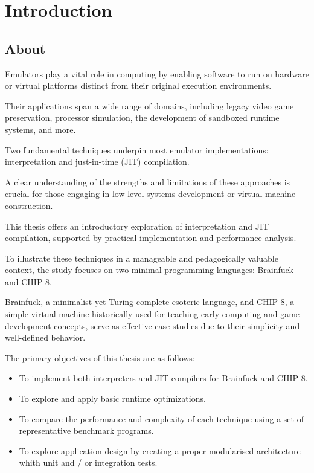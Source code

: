 \chapter{Introduction}
\label{chap:ch1}

\section{About}
\label{chap:ch1sec1}

\par Emulators play a vital role in computing by enabling software to run on hardware or virtual platforms distinct from their original execution environments.

\par Their applications span a wide range of domains, including legacy video game preservation, processor simulation, the development of sandboxed runtime systems, and more.

\par Two fundamental techniques underpin most emulator implementations: interpretation and just-in-time (JIT) compilation.

\par A clear understanding of the strengths and limitations of these approaches is crucial for those engaging in low-level systems development or virtual machine construction.

\par This thesis offers an introductory exploration of interpretation and JIT compilation, supported by practical implementation and performance analysis.

\par To illustrate these techniques in a manageable and pedagogically valuable context, the study focuses on two minimal programming languages: Brainfuck and CHIP-8.

\par Brainfuck, a minimalist yet Turing-complete esoteric language, and CHIP-8, a simple virtual machine historically used for teaching early computing and game development concepts, serve as effective case studies due to their simplicity and well-defined behavior.

\par The primary objectives of this thesis are as follows:

\begin{itemize}
	\item To implement both interpreters and JIT compilers for Brainfuck and CHIP-8.
	\item To explore and apply basic runtime optimizations.
	\item To compare the performance and complexity of each technique using a set of representative benchmark programs.
	\item To explore application design by creating a proper modularised architecture whith unit and / or integration tests.
\end{itemize}

